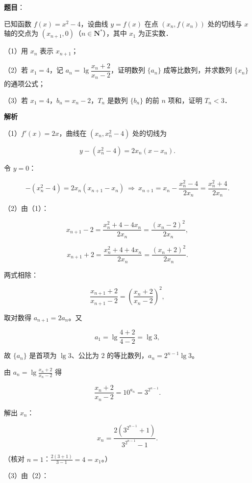 \begin{answer}

\textbf{题目}：

已知函数 $f(x)=x^2-4$，设曲线 $y=f(x)$ 在点 $(x_n,f(x_n))$ 处的切线与 $x$ 轴的交点为 $(x_{n+1},0)$（$n\in\mathbf N^*$），其中 $x_1$ 为正实数．

（1）用 $x_n$ 表示 $x_{n+1}$；

（2）若 $x_1=4$，记 $a_n=\lg\dfrac{x_n+2}{x_n-2}$，证明数列 $\{a_n\}$ 成等比数列，并求数列 $\{x_n\}$ 的通项公式；

（3）若 $x_1=4$，$b_n=x_n-2$，$T_n$ 是数列 $\{b_n\}$ 的前 $n$ 项和，证明 $T_n<3$．

\textbf{解析}

（1）$f'(x)=2x$，曲线在 $(x_n,x_n^2-4)$ 处的切线为

\nopagebreak[4]
\[y-(x_n^2-4)=2x_n(x-x_n).\]

令 $y=0$：

\nopagebreak[4]
\[-(x_n^2-4)=2x_n(x_{n+1}-x_n)
\ \Longrightarrow\ x_{n+1}=x_n-\frac{x_n^2-4}{2x_n}
=\frac{x_n^2+4}{2x_n}.\]

（2）由（1）：

\nopagebreak[4]
\[x_{n+1}-2=\frac{x_n^2+4-4x_n}{2x_n}=\frac{(x_n-2)^2}{2x_n},\]

\nopagebreak[4]
\[x_{n+1}+2=\frac{x_n^2+4+4x_n}{2x_n}=\frac{(x_n+2)^2}{2x_n}.\]

两式相除：

\nopagebreak[4]
\[\frac{x_{n+1}+2}{x_{n+1}-2}=\left(\frac{x_n+2}{x_n-2}\right)^2,\]

取对数得 $a_{n+1}=2a_n$。又

\nopagebreak[4]
\[a_1=\lg\frac{4+2}{4-2}=\lg3,\]

故 $\{a_n\}$ 是首项为 $\lg3$、公比为 $2$ 的等比数列，$a_n=2^{n-1}\lg3$。

由 $a_n=\lg\frac{x_n+2}{x_n-2}$ 得

\nopagebreak[4]
\[\frac{x_n+2}{x_n-2}=10^{a_n}=3^{2^{n-1}} .\]

解出 $x_n$：

\nopagebreak[4]
\[x_n=\frac{2\left(3^{2^{n-1}}+1\right)}{3^{2^{n-1}}-1}.\]

（核对 $n=1$：$\frac{2(3+1)}{3-1}=4=x_1$。）

（3）由（2）：


\end{answer}
